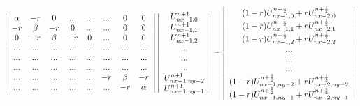 \[
\left| 
\begin{array}{ccc ccccc}
\alpha & -r      & 0     & ...  & ...  & ...  & 0       & 0      \\
-r     & \beta   & -r    & 0    & ...  & ...  & 0       & 0      \\
0      &  -r     &\beta  & -r   & 0    & ...  & 0       & 0      \\
...    & ...     & ...   & ...  & ...  & ...  & ...     & ...    \\
...    & ...     & ...   & ...  & ...  & ...  & ...     & ...    \\
...    & ...     & ...   & ...  & ...  & ...  & ...     & ...    \\
...    & ...     & ...   & ...  & ...  & -r   & \beta   & -r     \\
...    & ...     & ...   & ...  & ...  & ...  & -r      & \alpha \\
\end{array} 
\right|
\left| 
\begin{array}{c}
U_{nx-1,0}^{n+1} \\
U_{nx-1,1}^{n+1} \\
U_{nx-1,2}^{n+1} \\
...\\
...\\
...\\
U_{nx-1,ny-2}^{n+1} \\
U_{nx-1,ny-1}^{n+1} \\
\end{array} 
\right|
=
\left| 
\begin{array}{c}
(1-r)U_{nx-1,0}^{n+\frac{1}{2}} + rU_{nx-2,0}^{n+\frac{1}{2}}\\
(1-r)U_{nx-1,1}^{n+\frac{1}{2}} + rU_{nx-2,1}^{n+\frac{1}{2}}\\
(1-r)U_{nx-1,2}^{n+\frac{1}{2}} + rU_{nx-2,2}^{n+\frac{1}{2}}\\
...\\
...\\
...\\
(1-r)U_{nx-1,ny-2}^{n+\frac{1}{2}} + rU_{nx-2,ny-2}^{n+\frac{1}{2}}\\
(1-r)U_{nx-1,ny-1}^{n+\frac{1}{2}} + rU_{nx-2,ny-1}^{n+\frac{1}{2}}\\
\end{array} 
\right|
\]



